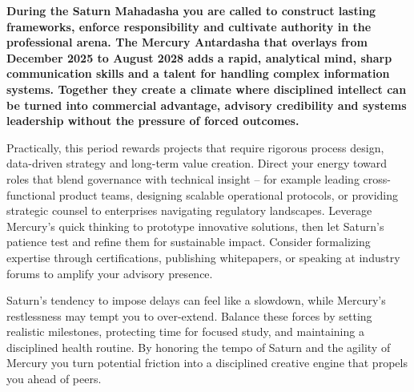 \label{topic55}

{\fontsize{9.5}{13.8}\selectfont\bfseries\color{DeepSlate} During the Saturn Mahadasha you are called to construct lasting frameworks, enforce responsibility and cultivate authority in the professional arena. The Mercury Antardasha that overlays from December 2025 to August 2028 adds a rapid, analytical mind, sharp communication skills and a talent for handling complex information systems. Together they create a climate where disciplined intellect can be turned into commercial advantage, advisory credibility and systems leadership without the pressure of forced outcomes.}\par\vspace{2mm}

{\fontsize{9}{13}\selectfont Practically, this period rewards projects that require rigorous process design, data-driven strategy and long-term value creation. Direct your energy toward roles that blend governance with technical insight -- for example leading cross-functional product teams, designing scalable operational protocols, or providing strategic counsel to enterprises navigating regulatory landscapes. Leverage Mercury's quick thinking to prototype innovative solutions, then let Saturn's patience test and refine them for sustainable impact. Consider formalizing expertise through certifications, publishing whitepapers, or speaking at industry forums to amplify your advisory presence.}\par\vspace{1.8mm}

{\fontsize{9}{13}\selectfont Saturn's tendency to impose delays can feel like a slowdown, while Mercury's restlessness may tempt you to over-extend. Balance these forces by setting realistic milestones, protecting time for focused study, and maintaining a disciplined health routine. By honoring the tempo of Saturn and the agility of Mercury you turn potential friction into a disciplined creative engine that propels you ahead of peers.}\par\vspace{1.8mm}

